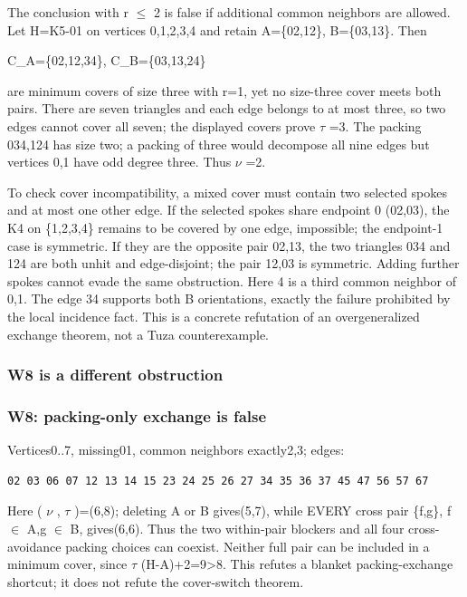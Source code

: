 \documentclass[11pt]{article}
\begin{document}
The conclusion with r \(\le\) 2 is false if additional common neighbors are allowed. Let H=K5-01 on vertices 0,1,2,3,4 and retain A=\{02,12\}, B=\{03,13\}. Then

C\_A=\{02,12,34\}, C\_B=\{03,13,24\}

are minimum covers of size three with r=1, yet no size-three cover meets both pairs. There are seven triangles and each edge belongs to at most three, so two edges cannot cover all seven; the displayed covers prove \(\tau\) =3. The packing 034,124 has size two; a packing of three would decompose all nine edges but vertices 0,1 have odd degree three. Thus \(\nu\) =2.

To check cover incompatibility, a mixed cover must contain two selected spokes and at most one other edge. If the selected spokes share endpoint 0 (02,03), the K4 on \{1,2,3,4\} remains to be covered by one edge, impossible; the endpoint-1 case is symmetric. If they are the opposite pair 02,13, the two triangles 034 and 124 are both unhit and edge-disjoint; the pair 12,03 is symmetric. Adding further spokes cannot evade the same obstruction. Here 4 is a third common neighbor of 0,1. The edge 34 supports both B orientations, exactly the failure prohibited by the local incidence fact. This is a concrete refutation of an overgeneralized exchange theorem, not a Tuza counterexample.

\subsubsection{W8 is a different obstruction}\label{w8-is-a-different-obstruction}

\subsubsection{W8: packing-only exchange is false}\label{w8-packing-only-exchange-is-false}

Vertices0..7, missing01, common neighbors exactly2,3; edges:

\begin{verbatim}
02 03 06 07 12 13 14 15 23 24 25 26 27 34 35 36 37 45 47 56 57 67
\end{verbatim}

Here ( \(\nu\) , \(\tau\) )=(6,8); deleting A or B gives(5,7), while EVERY cross pair \{f,g\}, f \(\in\) A,g \(\in\) B, gives(6,6). Thus the two within-pair blockers and all four cross-avoidance packing choices can coexist. Neither full pair can be included in a minimum cover, since \(\tau\) (H-A)+2=9\textgreater8. This refutes a blanket packing-exchange shortcut; it does not refute the cover-switch theorem.
\end{document}
